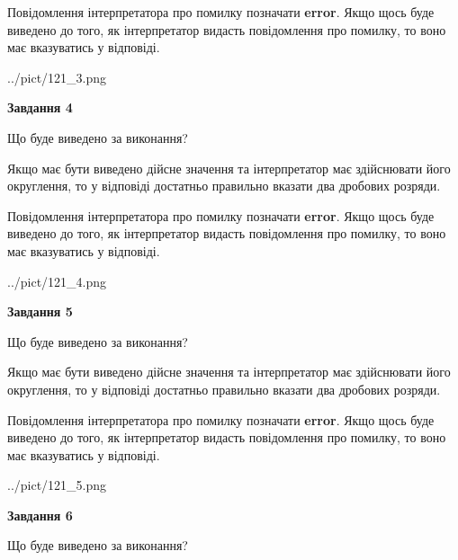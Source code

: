 \documentclass[12pt, ukrainian]{article}
\begin{document}
{\begin {Large}
Повідомлення інтерпретатора про помилку позначати \textbf{error}.
Якщо щось буде виведено до того, як інтерпретатор видасть повідомлення про помилку, 
то воно має вказуватись у відповіді. \par

\begin{center}
	{../pict/121_3.png}
\end{center}
\newpage

{\begin {center}\textbf{Завдання 4}\end {center}}\par
Що буде виведено за виконання? \par

Якщо має бути виведено дійсне значення та інтерпретатор має здійснювати його округлення, 
то у відповіді достатньо правильно вказати два дробових розряди.

Повідомлення інтерпретатора про помилку позначати \textbf{error}.
Якщо щось буде виведено до того, як інтерпретатор видасть повідомлення про помилку, 
то воно має вказуватись у відповіді. \par

\begin{center}
	{../pict/121_4.png}
\end{center}
\newpage

{\begin {center}\textbf{Завдання 5}\end {center}}\par
Що буде виведено за виконання? \par

Якщо має бути виведено дійсне значення та інтерпретатор має здійснювати його округлення, 
то у відповіді достатньо правильно вказати два дробових розряди.

Повідомлення інтерпретатора про помилку позначати \textbf{error}.
Якщо щось буде виведено до того, як інтерпретатор видасть повідомлення про помилку, 
то воно має вказуватись у відповіді. \par

\begin{center}
	{../pict/121_5.png}
\end{center}
\newpage

{\begin {center}\textbf{Завдання 6}\end {center}}\par
Що буде виведено за виконання? \par


\end{Large}}
\end{document}
